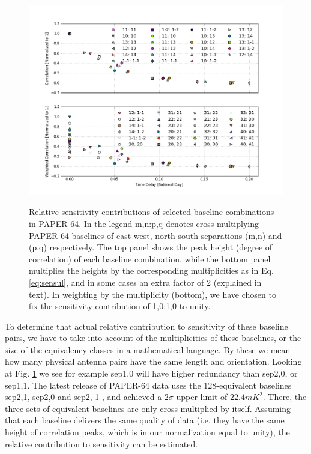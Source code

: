 \documentclass[preprint2,numberedappendix,tighten,twocolappendix]{aastex6}  %
\renewcommand\[{\begin{equation}}
\renewcommand\]{\end{equation}}
\begin{document}
\begin{figure}[H]
\includegraphics[width=\linewidth]{sensitivity}
\label{fig:sensplot}
\caption{Relative sensitivity contributions of selected baseline combinations in PAPER-64. In the legend m,n:p,q denotes cross
multiplying PAPER-64 baselines of east-west, north-south separations (m,n) and (p,q) respectively. The top
panel shows the peak height (degree of correlation) of each baseline
combination, while the bottom panel multiplies the heights by the
corresponding multiplicities as in Eq. \eqref{eq:sensul}, and in some cases an extra factor of 2 (explained in text). 
In weighting by the multiplicity (bottom), we have chosen to fix the sensitivity 
contribution of 1,0:1,0 to unity. }


\end{figure}


To determine that actual relative contribution to sensitivity of these
baseline pairs, we have to take into account of the multiplicities of
these baselines, or the size of the equivalency classes in a mathematical
language. By these we mean how many physical antenna pairs have the
same length and orientation. Looking at Fig. \ref{fig:sensplot}
we see for example sep1,0 will have higher redundancy than sep2,0,
or sep1,1. The latest release of PAPER-64 data uses the 128-equivalent baselines sep2,1,
sep2,0 and sep2,-1 \cite{Ali2015}, and achieved a $2\sigma$ upper
limit of $22.4mK^{2}$. There, the three sets of equivalent baselines
are only cross multiplied by itself. Assuming that each baseline delivers
the same quality of data (i.e. they have the same height of correlation
peaks, which is in our normalization equal to unity), the relative
contribution to sensitivity can be estimated. 
\end{document}
